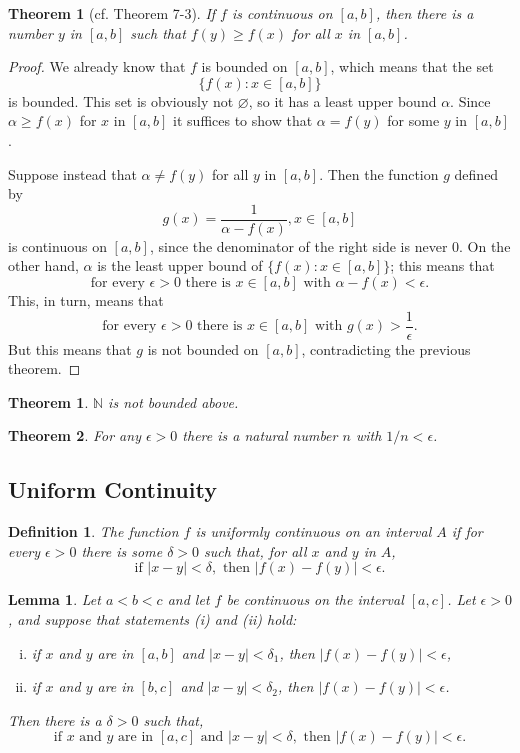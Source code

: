 \documentclass{article}
\numberwithin{corollary}{subsection}
\numberwithin{definition}{subsection}
\newtheorem*{definition*}{Definition}
\numberwithin{lemma}{subsection}
\newtheorem*{lemma*}{Lemma}
\newtheorem{theorem}{Theorem}
\numberwithin{theorem}{subsection}
\newtheorem*{theorem*}{Theorem}
\begin{document}
\begin{theorem*}[cf. Theorem 7-3]
  If $f$ is continuous on $[a, b]$, then there is a number $y$ in $[a, b]$ such
  that $f(y) \geq f(x)$ for all $x$ in $[a, b]$.
\end{theorem*}
\begin{proof}
  We already know that $f$ is bounded on $[a, b]$, which means that the set \[
    \{f(x): x \in [a, b]\}
  \] is bounded. This set is obviously not $\varnothing$, so it has a least
  upper bound $\alpha$. Since $\alpha \geq f(x)$ for $x$ in $[a, b]$ it
  suffices to show that $\alpha = f(y)$ for some $y$ in $[a, b]$.

  Suppose instead that $\alpha \neq f(y)$ for all $y$ in $[a, b]$. Then the
  function $g$ defined by \[
    g(x) = \frac{1}{\alpha - f(x)}, x \in [a, b]
  \] is continuous on $[a, b]$, since the denominator of the right side is
  never 0. On the other hand, $\alpha$ is the least upper bound of $\{f(x): x
  \in [a, b]\}$; this means that \[
    \text{for every } \epsilon > 0 \text{ there is } x \in [a, b] \text{ with }
    \alpha - f(x) < \epsilon.
  \] This, in turn, means that \[
    \text{for every } \epsilon > 0 \text{ there is } x \in [a, b] \text{ with }
    g(x) > \frac{1}{\epsilon}.
  \] But this means that $g$ is not bounded on $[a, b]$, contradicting the
  previous theorem.
\end{proof}

\begin{theorem}
  $\mathbb{N}$ is not bounded above.
\end{theorem}

\begin{theorem}
  For any $\epsilon > 0$ there is a natural number $n$ with $1/n < \epsilon$.
\end{theorem}

\subsection{Uniform Continuity}

\begin{definition*}
  The function $f$ is \emph{uniformly continuous on an interval $A$} if for
  every $\epsilon > 0$ there is some $\delta > 0$ such that, for all $x$ and
  $y$ in $A$, \[
    \text{if } |x - y| < \delta, \text{ then } |f(x) - f(y)| < \epsilon.
  \]
\end{definition*}

\begin{lemma*}
  Let $a < b < c$ and let $f$ be continuous on the interval $[a, c]$. Let
  $\epsilon > 0$, and suppose that statements (i) and (ii) hold:
  \begin{enumerate}[(i)]
    \item if $x$ and $y$ are in $[a, b]$ and $|x - y| < \delta_1$, then
      $|f(x) - f(y)| < \epsilon$,
    \item if $x$ and $y$ are in $[b, c]$ and $|x - y| < \delta_2$, then
      $|f(x) - f(y)| < \epsilon$.
  \end{enumerate}
  Then there is a $\delta > 0$ such that, \[
    \text{if } x \text{ and } y \text{ are in } [a, c] \text{ and } |x - y| <
    \delta, \text{ then } |f(x) - f(y)| < \epsilon.
  \]
\end{lemma*}
\end{document}

